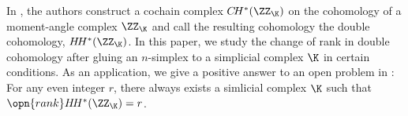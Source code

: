 In \cite{LPSS-2023}, the authors construct a cochain complex
    $C\!H^*(\ZZ_{\K})$ on the cohomology of a moment-angle complex $\ZZ_{\K}$
    and call the resulting cohomology the double cohomology,
    $H\!H^*(\ZZ_{\K})$. In this paper, we study the change of
    rank in double cohomology after gluing an $n$-simplex to
    a simplicial complex $\K$ in certain conditions. As an application,
    we give a positive answer to an open problem in \cite{LPSS-2023}:
    For any even integer $r$, there always
    exists a simlicial complex $\K$ such that 
    $\opn{rank} H\!H^*(\ZZ_{\K})=r$.